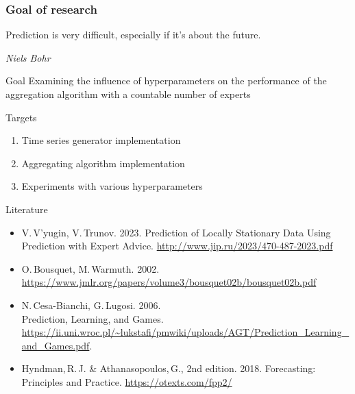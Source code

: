 \documentclass{beamer}
\begin{document}
\begin{frame}
\frametitle{Goal of research}
\setlength{}
\epigraph{Prediction is very difficult, especially if it's about the future.}{\textit{Niels Bohr}}

\begin{block}{Goal}
Examining the influence of hyperparameters on the performance of the aggregation algorithm with a countable number of experts
\end{block}


\begin{block}{Targets}
\begin{enumerate}
\item Time series generator implementation
\item Aggregating algorithm implementation
\item Experiments with various hyperparameters    
\end{enumerate}
\end{block}



\end{frame}

\begin{frame}{Literature}
    \begin{itemize}
    \item V.\,V’yugin, V.\,Trunov. 2023. Prediction of Locally Stationary Data Using Prediction with
Expert Advice. \url{http://www.jip.ru/2023/470-487-2023.pdf}
     \item O.\,Bousquet, M.\,Warmuth. 2002. \url{https://www.jmlr.org/papers/volume3/bousquet02b/bousquet02b.pdf}

    
    \item N.\,Cesa-Bianchi, G.\,Lugosi. 2006. \\
    Prediction, Learning, and Games.
    \url{https://ii.uni.wroc.pl/~lukstafi/pmwiki/uploads/AGT/Prediction_Learning_and_Games.pdf}.
    
    \item Hyndman,\,R.\,J. \& Athanasopoulos,\,G., 2nd edition. 2018. Forecasting: Principles and Practice. \url{https://otexts.com/fpp2/}
    
%
  
    \end{itemize}
\end{frame}
\end{document}
